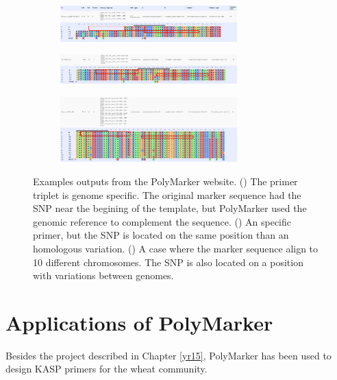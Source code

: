\begin{figure}
\centering
\begin{subfigure}{1\textwidth}
\caption{}
\centering
\label{fig:poly:non-hom-sp}
\includegraphics[width=0.75\textwidth]{PolyMarker/Figures/website/non-hom-sp.png}
\end{subfigure}
\begin{subfigure}{1\textwidth}
\caption{}
\centering
\label{fig:poly:hom-sp}
\includegraphics[width=0.75\textwidth]{PolyMarker/Figures/website/hom-sp.png}
\end{subfigure}
\begin{subfigure}{1\textwidth}
\caption{}
\centering
\label{fig:poly:hom-multi}
\includegraphics[width=0.75\textwidth]{PolyMarker/Figures/website/hom-multi.png}
\end{subfigure}
\caption[Examples outputs from the PolyMarker website.]{Examples outputs from the PolyMarker website. () The primer triplet is genome specific. The original marker sequence had the SNP near the begining of the template, but PolyMarker used the genomic reference to complement the sequence. () An specific primer, but the SNP is located on the same position than an homologous variation. () A case where the marker sequence align to 10 different chromosomes. The SNP is also located on a position with variations between genomes.}
\label{fig:poly:website}
\end{figure}


\section{Applications of PolyMarker}
Besides the project described in Chapter \ref{yr15}, PolyMarker has been used to design KASP primers for the wheat community.


